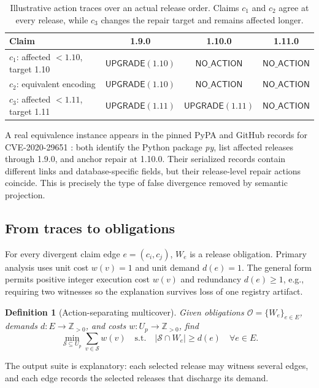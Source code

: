 \documentclass[10pt,conference]{IEEEtran}
\newtheorem{definition}{Definition}
\newcommand{\Obl}{\mathcal{O}}
\newcommand{\Suit}{\mathcal{S}}
\newcommand{\noaction}{\ensuremath{\mathsf{NO\_ACTION}}}
\newcommand{\upgrade}{\ensuremath{\mathsf{UPGRADE}}}
\newcommand{\tblfont}{\footnotesize}
\begin{document}
\begin{table}[t]
\centering
\caption{Illustrative action traces over an actual release order. Claims $c_1$ and $c_2$ agree at every release, while $c_3$ changes the repair target and remains affected longer.}
\label{tab:example}
{\tblfont
\begin{tabularx}{\columnwidth}{@{}Yccc@{}}
\toprule
Claim & 1.9.0 & 1.10.0 & 1.11.0 \\
\midrule
$c_1$: affected $<1.10$, target 1.10 & $\upgrade(1.10)$ & $\noaction$ & $\noaction$ \\
$c_2$: equivalent encoding & $\upgrade(1.10)$ & $\noaction$ & $\noaction$ \\
$c_3$: affected $<1.11$, target 1.11 & $\upgrade(1.11)$ & $\upgrade(1.11)$ & $\noaction$ \\
\bottomrule
\end{tabularx}}
\end{table}

A real equivalence instance appears in the pinned PyPA and GitHub records for CVE-2020-29651 \cite{pypaadvisory,ghad}: both identify the Python package \emph{py}, list affected releases through 1.9.0, and anchor repair at 1.10.0. Their serialized records contain different links and database-specific fields, but their release-level repair actions coincide. This is precisely the type of false divergence removed by semantic projection.

\subsection{From traces to obligations}
For every divergent claim edge $e=(c_i,c_j)$, $W_e$ is a release obligation. Primary analysis uses unit cost $w(v)=1$ and unit demand $d(e)=1$. The general form permits positive integer execution cost $w(v)$ and redundancy $d(e)\geq 1$, e.g., requiring two witnesses so the explanation survives loss of one registry artifact.

\begin{definition}[Action-separating multicover]
Given obligations $\Obl=\{W_e\}_{e\in E}$, demands $d:E\rightarrow\mathbb{Z}_{>0}$, and costs $w:U_p\rightarrow\mathbb{Z}_{>0}$, find
\[
\min_{\Suit\subseteq U_p}\sum_{v\in\Suit}w(v)
\quad\text{s.t.}\quad
|\Suit\cap W_e|\geq d(e)\quad\forall e\in E.
\]
\end{definition}

The output suite is explanatory: each selected release may witness several edges, and each edge records the selected releases that discharge its demand.
\end{document}
